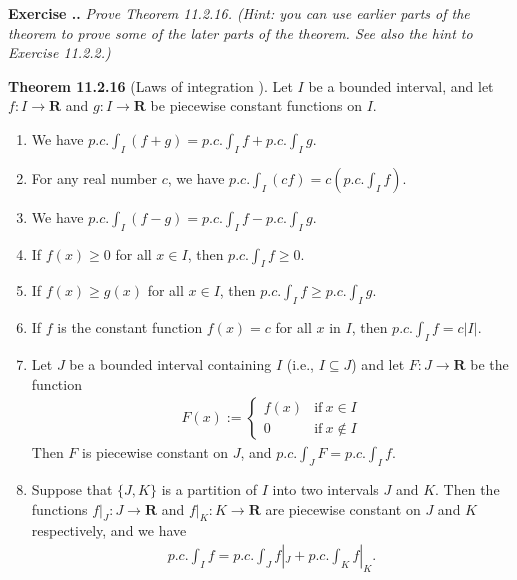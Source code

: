 \documentclass{book}
\newcommand{\titl}[1]{\noindent\textbf{#1}}
\newcounter{Exercise}[section]
\renewcommand{\theExercise}{\thesection.\arabic{Exercise}.}
\newcommand{\new}{\vspace{1.5em}\noindent\textbf{{Exercise \stepcounter{Exercise}\textbf{\theExercise}}} }
\begin{document}
\new\emph{Prove Theorem 11.2.16. (Hint: you can use earlier parts of the theorem to prove some of the later parts of the theorem. See also the hint to Exercise 11.2.2.)}

\begin{framed}
\titl{Theorem 11.2.16} (Laws of integration ). Let $I$ be a bounded interval, and let $f:I\to\mathbf{R}$ and $g:I\to\mathbf{R}$ be piecewise constant functions on $I$.
\begin{enumerate}
    \item We have $p.c.\int_{I}(f+g)=p.c.\int_{I}f+p.c.\int_{I}g$.
    \item For any real number $c$, we have $p.c.\int_{I}(cf)=c(p.c.\int_{I}f)$.
    \item We have $p.c.\int_{I}(f-g)=p.c.\int_{I}f-p.c.\int_{I}g$.
    \item If $f(x)\geq 0$ for all $x\in I$, then $p.c.\int_{I}f\geq 0$.
    \item If $f(x)\geq g(x)$ for all $x\in I$, then $p.c.\int_{I}f\geq p.c.\int_{I}g$.
    \item If $f$ is the constant function $f(x)=c$ for all $x$ in $I$, then $p.c.\int_{I}f=c|I|$.
    \item Let $J$ be a bounded interval containing $I$ (i.e., $I\subseteq J$) and let $F:J\to\mathbf{R}$ be the function
        \begin{align*}
            F(x):=\left\{\begin{array}{ll}
                f(x)&\text{if}\ x\in I\\
                0   &\text{if}\ x\notin I
            \end{array}\right.
        \end{align*}
    Then $F$ is piecewise constant on $J$, and $p.c.\int_{J}F=p.c.\int_{I}f$.
    \item Suppose that $\{J,K\}$ is a partition of $I$ into two intervals $J$ and $K$. Then the functions $f|_J:J\to\mathbf{R}$ and $f|_K:K\to\mathbf{R}$ are piecewise constant on $J$ and $K$ respectively, and we have
        \begin{align*}
            p.c.\int_{I}f=p.c.\int_{J}f|_J+p.c.\int_{K}f|_K.
        \end{align*}
\end{enumerate}
\end{framed}
\end{document}
